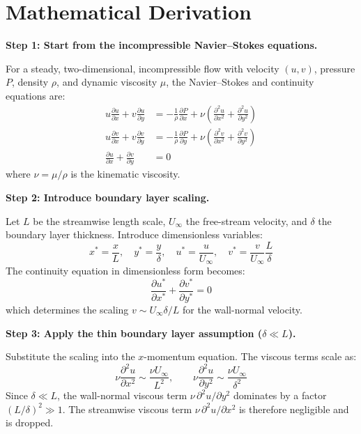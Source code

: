 \section*{Mathematical Derivation}

\textbf{Step 1: Start from the incompressible Navier--Stokes equations.}

For a steady, two-dimensional, incompressible flow with velocity $(u, v)$, pressure $P$, density $\rho$, and dynamic viscosity $\mu$, the Navier--Stokes and continuity equations are:
\begin{align}
u\frac{\partial u}{\partial x} + v\frac{\partial u}{\partial y} &= -\frac{1}{\rho}\frac{\partial P}{\partial x} + \nu\left(\frac{\partial^2 u}{\partial x^2} + \frac{\partial^2 u}{\partial y^2}\right) \\
u\frac{\partial v}{\partial x} + v\frac{\partial v}{\partial y} &= -\frac{1}{\rho}\frac{\partial P}{\partial y} + \nu\left(\frac{\partial^2 v}{\partial x^2} + \frac{\partial^2 v}{\partial y^2}\right) \\
\frac{\partial u}{\partial x} + \frac{\partial v}{\partial y} &= 0
\end{align}
where $\nu = \mu/\rho$ is the kinematic viscosity.

\textbf{Step 2: Introduce boundary layer scaling.}

Let $L$ be the streamwise length scale, $U_\infty$ the free-stream velocity, and $\delta$ the boundary layer thickness. Introduce dimensionless variables:
\begin{equation}
x^* = \frac{x}{L},\quad y^* = \frac{y}{\delta},\quad u^* = \frac{u}{U_\infty},\quad v^* = \frac{v}{U_\infty}\frac{L}{\delta}
\end{equation}
The continuity equation in dimensionless form becomes:
\begin{equation}
\frac{\partial u^*}{\partial x^*} + \frac{\partial v^*}{\partial y^*} = 0
\end{equation}
which determines the scaling $v \sim U_\infty \delta / L$ for the wall-normal velocity.

\textbf{Step 3: Apply the thin boundary layer assumption ($\delta \ll L$).}

Substitute the scaling into the $x$-momentum equation. The viscous terms scale as:
\begin{equation}
\nu\frac{\partial^2 u}{\partial x^2} \sim \frac{\nu U_\infty}{L^2},\qquad \nu\frac{\partial^2 u}{\partial y^2} \sim \frac{\nu U_\infty}{\delta^2}
\end{equation}
Since $\delta \ll L$, the wall-normal viscous term $\nu\,\partial^2 u/\partial y^2$ dominates by a factor $(L/\delta)^2 \gg 1$. The streamwise viscous term $\nu\,\partial^2 u/\partial x^2$ is therefore negligible and is dropped.

